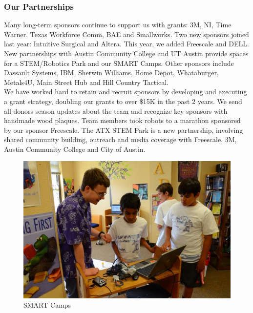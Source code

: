 \subsubsection{Our Partnerships}
Many long-term sponsors continue to support us with grants: 3M, NI, Time Warner, Texas Workforce Comm, BAE and Smallworks. Two new sponsors joined last year: Intuitive Surgical and Altera. This year, we added Freescale and DELL. New partnerships with Austin Community College and UT Austin provide spaces for a STEM/Robotics Park and our SMART Camps. Other sponsors include Dassault Systems, IBM, Sherwin Williams, Home Depot, Whataburger, Metals4U, Main Street Hub and Hill Country Tactical.\\

We have worked hard to retain and recruit sponsors by developing and executing a grant strategy, doubling our grants to over \$15K in the past 2 years. We send all donors season updates about the team and recognize key sponsors with handmade wood plaques. Team members took robots to a marathon sponsored by our sponsor Freescale. The ATX STEM Park is a new partnership, involving shared community building, outreach and media coverage with Freescale, 3M, Austin Community College and City of Austin.\\

\begin{figure}
	\color{darkgray}
	\centering
	\includegraphics[height=0.3\linewidth]{smart2}
	\caption[]{SMART Camps}
	\label{fig:smart2}
\end{figure}

